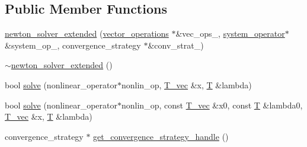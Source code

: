 \subsection*{Public Member Functions}
\begin{DoxyCompactItemize}
\item 
\hyperlink{classnumerical__algos_1_1newton__method__extended_1_1newton__solver__extended_a51a5362d96e3f54cc36347fe8cbd047d}{newton\-\_\-solver\-\_\-extended} (\hyperlink{container__test_8cpp_aca3cc0310428d338f3a165c7823d6499}{vector\-\_\-operations} $\ast$\&vec\-\_\-ops\-\_\-, \hyperlink{structsystem__operator}{system\-\_\-operator}$\ast$\&system\-\_\-op\-\_\-, convergence\-\_\-strategy $\ast$\&conv\-\_\-strat\-\_\-)
\item 
\hyperlink{classnumerical__algos_1_1newton__method__extended_1_1newton__solver__extended_a2c783ff887b674e6e7847bc1cf533e13}{$\sim$newton\-\_\-solver\-\_\-extended} ()
\item 
bool \hyperlink{classnumerical__algos_1_1newton__method__extended_1_1newton__solver__extended_a7ab641a3c30113427ec57894ea395d00}{solve} (nonlinear\-\_\-operator$\ast$nonlin\-\_\-op, \hyperlink{classnumerical__algos_1_1newton__method__extended_1_1newton__solver__extended_a9271222e5554cc0824604ab062a2cace}{T\-\_\-vec} \&x, \hyperlink{classnumerical__algos_1_1newton__method__extended_1_1newton__solver__extended_a32ed9a6f34b0fcff996c913f4695e1c0}{T} \&lambda)
\item 
bool \hyperlink{classnumerical__algos_1_1newton__method__extended_1_1newton__solver__extended_addb6f412050b9e268306890464471d10}{solve} (nonlinear\-\_\-operator$\ast$nonlin\-\_\-op, const \hyperlink{classnumerical__algos_1_1newton__method__extended_1_1newton__solver__extended_a9271222e5554cc0824604ab062a2cace}{T\-\_\-vec} \&x0, const \hyperlink{classnumerical__algos_1_1newton__method__extended_1_1newton__solver__extended_a32ed9a6f34b0fcff996c913f4695e1c0}{T} \&lambda0, \hyperlink{classnumerical__algos_1_1newton__method__extended_1_1newton__solver__extended_a9271222e5554cc0824604ab062a2cace}{T\-\_\-vec} \&x, \hyperlink{classnumerical__algos_1_1newton__method__extended_1_1newton__solver__extended_a32ed9a6f34b0fcff996c913f4695e1c0}{T} \&lambda)
\item 
convergence\-\_\-strategy $\ast$ \hyperlink{classnumerical__algos_1_1newton__method__extended_1_1newton__solver__extended_a6e5da5eb41ac1c4033a00667043165c2}{get\-\_\-convergence\-\_\-strategy\-\_\-handle} ()
\end{DoxyCompactItemize}


